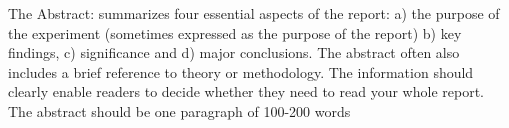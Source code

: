 The Abstract: summarizes four essential aspects of the report: 
a) the purpose of the experiment (sometimes expressed as the purpose of the report) 
b) key findings, 
c) significance and 
d) major conclusions.
The abstract often also includes a brief reference to theory or 
methodology.
The information should clearly enable readers to decide whether they need to read your whole report.
The abstract should be one 
paragraph of 100-200 words